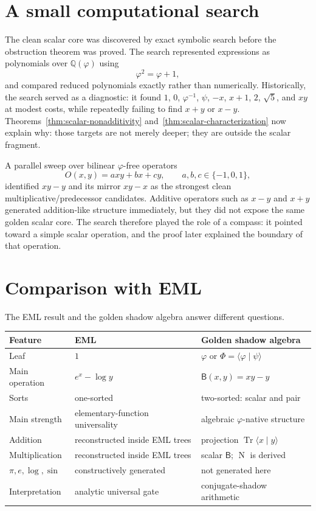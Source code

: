 \documentclass[11pt]{article}
\newcommand{\B}{\mathsf{B}}
\newcommand{\Tr}{\operatorname{Tr}}
\newcommand{\Nm}{\operatorname{N}}
\newcommand{\ph}{\varphi}
\newcommand{\ps}{\psi}
\newcommand{\Q}{\mathbb{Q}}
\begin{document}
\section{A small computational search}

The clean scalar core was discovered by exact symbolic search before the obstruction theorem was proved.  The search represented expressions as polynomials over $\Q(\ph)$ using
\[
    \ph^2=\ph+1,
\]
and compared reduced polynomials exactly rather than numerically.  Historically, the search served as a diagnostic: it found $1$, $0$, $\ph^{-1}$, $\ps$, $-x$, $x+1$, $2$, $\sqrt5$, and $xy$ at modest costs, while repeatedly failing to find $x+y$ or $x-y$.  Theorems~\ref{thm:scalar-nonadditivity} and~\ref{thm:scalar-characterization} now explain why: those targets are not merely deeper; they are outside the scalar fragment.

A parallel sweep over bilinear $\ph$-free operators
\[
    O(x,y)=a xy+b x+c y,\qquad a,b,c\in\{-1,0,1\},
\]
identified $xy-y$ and its mirror $xy-x$ as the strongest clean multiplicative/predecessor candidates.  Additive operators such as $x-y$ and $x+y$ generated addition-like structure immediately, but they did not expose the same golden scalar core.  The search therefore played the role of a compass: it pointed toward a simple scalar operation, and the proof later explained the boundary of that operation.

\section{Comparison with EML}

The EML result and the golden shadow algebra answer different questions.

\begin{center}
\begin{tabular}{lll}
\toprule
Feature & EML & Golden shadow algebra \\
\midrule
Leaf & $1$ & $\ph$ or $\Phi=\langle\ph\mid\ps\rangle$ \\
Main operation & $e^x-\log y$ & $\B(x,y)=xy-y$ \\
Sorts & one-sorted & two-sorted: scalar and pair \\
Main strength & elementary-function universality & algebraic $\ph$-native structure \\
Addition & reconstructed inside EML trees & projection $\Tr\langle x\mid y\rangle$ \\
Multiplication & reconstructed inside EML trees & scalar $\B$; $\Nm$ is derived \\
$\pi,e,\log,\sin$ & constructively generated & not generated here \\
Interpretation & analytic universal gate & conjugate-shadow arithmetic \\
\bottomrule
\end{tabular}
\end{center}
\end{document}
